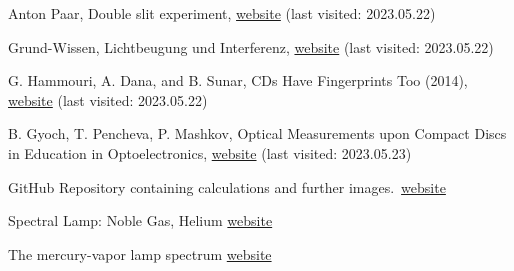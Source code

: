 \documentclass[12pt,a4paper]{article}
\begin{document}
\begin{thebibliography}{99}

Anton Paar, Double slit experiment, \href{https://wiki.anton-paar.com/ch-de/doppelspaltexperiment/}{website} (last visited: 2023.05.22)

Grund-Wissen, Lichtbeugung und Interferenz, \href{https://www.grund-wissen.de/physik/optik/wellenoptik.html}{website} (last visited: 2023.05.22)

G. Hammouri, A. Dana, and B. Sunar, CDs Have Fingerprints Too (2014), \href{https://www.researchgate.net/figure/Lands-and-pits-image-using-a-scanning-electron-microscope_fig3_221291847}{website} (last visited: 2023.05.22)

B. Gyoch, T. Pencheva, P. Mashkov, Optical Measurements upon Compact Discs in Education in Optoelectronics, \href{https://ieeexplore.ieee.org/stamp/stamp.jsp?tp=&arnumber=5547333&tag=1}{website} (last visited: 2023.05.23)

GitHub Repository containing calculations and further images.~\href{https://github.com/Noothless/Do-it-yourself-Spectrometer}{website}

Spectral Lamp: Noble Gas, Helium \href{http://www.lamptech.co.uk/Spec%20Sheets/D%20SP%20Philips%20LL%20He.htm}{website}

The mercury-vapor lamp spectrum \href{https://www.researchgate.net/figure/The-mercury-vapor-lamp-spectrum_fig4_316789076}{website}


\end{thebibliography}
\end{document}
